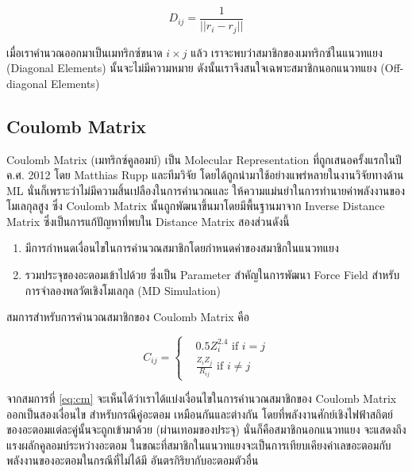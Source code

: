 \begin{equation}
    D_{ij} = \frac{1}{||r_{i} - r_{j}||}
\end{equation}

เมื่อเราคำนวณออกมาเป็นเมทริกซ์ขนาด $i \times j$ แล้ว เราจะพบว่าสมาชิกของเมทริกซ์ในแนวทแยง (Diagonal Elements) นั้นจะไม่มีความหมาย 
ดังนั้นเราจึงสนใจเฉพาะสมาชิกนอกแนวทแยง (Off-diagonal Elements)

\subsection{Coulomb Matrix}

Coulomb Matrix (เมทริกซ์คูลอมบ์) เป็น Molecular Representation ที่ถูกเสนอครั้งแรกในปี ค.ศ. 2012 โดย Matthias Rupp 
และทีมวิจัย\cite{rupp2012} โดยได้ถูกนำมาใช้อย่างแพร่หลายในงานวิจัยทางด้าน ML นั่นก็เพราะว่าไม่มีความสิ้นเปลืองในการคำนวณและ%
ให้ความแม่นยำในการทำนายค่าพลังงานของโมเลกุลสูง ซึ่ง Coulomb Matrix นั้นถูกพัฒนาขึ้นมาโดยมีพื้นฐานมาจาก Inverse Distance Matrix 
ซึ่งเป็นการแก้ปัญหาที่พบใน Distance Matrix สองส่วนดังนี้

\begin{enumerate}
    \item มีการกำหนดเงื่อนไขในการคำนวณสมาชิกโดยกำหนดค่าของสมาชิกในแนวทแยง
    \item รวมประจุของอะตอมเข้าไปด้วย ซึ่งเป็น Parameter สำคัญในการพัฒนา Force Field สำหรับการจำลองพลวัตเชิงโมเลกุล (MD Simulation)
\end{enumerate}

สมการสำหรับการคำนวณสมาชิกของ Coulomb Matrix คือ

\begin{equation}
    \label{eq:cm}
    C_{ij} =
    \begin{cases}
     & 0.5 Z_i^{2.4} \text{ if } i = j \\ 
     & \frac{Z_i Z_j}{R_{ij}} \text{ if } i \neq j
    \end{cases}
\end{equation}

จากสมการที่ \ref{eq:cm} จะเห็นได้ว่าเราได้แบ่งเงื่อนไขในการคำนวณสมาชิกของ Coulomb Matrix ออกเป็นสองเงื่อนไข สำหรับกรณีคู่อะตอม%
เหมือนกันและต่างกัน โดยที่พลังงานศักย์เชิงไฟฟ้าสถิตย์ของอะตอมแต่ละคู่นั้นจะถูกเข้ามาด้วย (ผ่านเทอมของประจุ) นั่นก็คือสมาชิกนอกแนวทแยง%
จะแสดงถึงแรงผลักคูลอมบ์ระหว่างอะตอม ในขณะที่สมาชิกในแนวทแยงจะเป็นการเทียบเคียงค่าเลขอะตอมกับพลังงานของอะตอมในกรณีที่ไม่ได้มี%
อันตรกิริยากับอะตอมตัวอื่น

